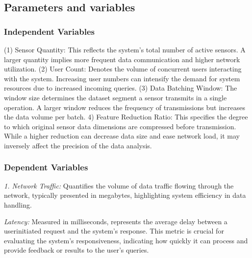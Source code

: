 \documentclass[11pt]{article}
\begin{document}
	
	\subsection{Parameters and variables}
	\subsubsection{Independent Variables}
	(1) Sensor Quantity: This reflects the system’s total number of active sensors. A
	larger quantity implies more frequent data communication and higher network utilization. (2) User Count: Denotes the volume of concurrent users interacting with
	the system. Increasing user numbers can intensify the demand for system resources
	due to increased incoming queries. (3) Data Batching Window: The window size
	determines the dataset segment a sensor transmits in a single operation. A larger
	window reduces the frequency of transmissions but increases the data volume per
	batch. 4) Feature Reduction Ratio: This specifies the degree to which original sensor
	data dimensions are compressed before transmission. While a higher reduction can
	decrease data size and ease network load, it may inversely affect the precision of the
	data analysis.
	\subsubsection{Dependent Variables}
	\textit{1. Network Traffic:} Quantifies the volume of data traffic flowing through the network, typically presented in megabytes, highlighting system efficiency in data
	handling.
	
	\textit{Latency:} Measured in milliseconds, represents the average delay between a userinitiated request and the system’s response. This metric is crucial for evaluating
	the system’s responsiveness, indicating how quickly it can process and provide
	feedback or results to the user’s queries.
	
\end{document}
